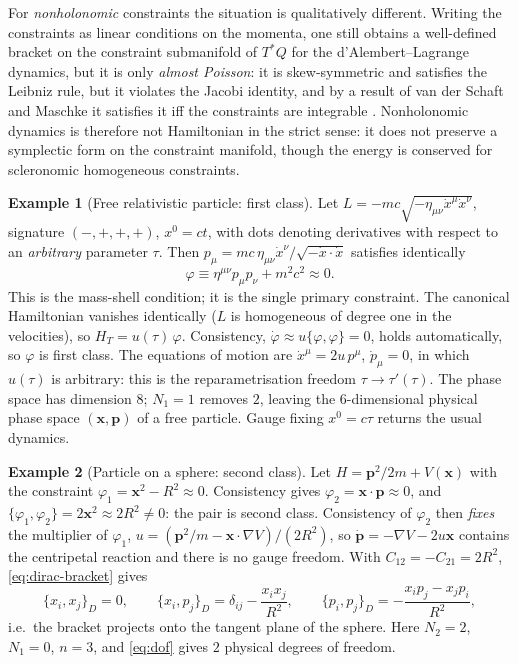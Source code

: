 \documentclass[11pt,a4paper]{article}
\theoremstyle{definition}
\newtheorem{example}{Example}[section]
\theoremstyle{plain}
\theoremstyle{remark}
\newcommand{\Pois}[2]{\{#1,#2\}}
\newcommand{\weq}{\approx}                 %
\begin{document}
For \emph{nonholonomic} constraints the situation is qualitatively different. Writing the
constraints as linear conditions on the momenta, one still obtains a well-defined
bracket on the constraint submanifold of $T^*Q$ for the d'Alembert--Lagrange dynamics, but it is
only \emph{almost Poisson}: it is skew-symmetric and satisfies the Leibniz rule, but it
violates the Jacobi identity, and by a result of van der Schaft and Maschke it satisfies it
iff the constraints are integrable \cite{vdSchaftMaschke1994}. Nonholonomic dynamics is therefore
not Hamiltonian in the strict sense: it does not preserve a symplectic form on the constraint
manifold, though the energy is conserved for scleronomic homogeneous constraints.

\begin{example}[Free relativistic particle: first class]\label{ex:relparticle}
Let $L=-mc\sqrt{-\eta_{\mu\nu}\dot x^\mu\dot x^\nu}$, signature $(-,+,+,+)$, $x^0=ct$, with
dots denoting derivatives with respect to an \emph{arbitrary} parameter $\tau$. Then
$p_\mu=mc\,\eta_{\mu\nu}\dot x^\nu/\sqrt{-\dot x\cdot\dot x}$ satisfies identically
\[
  \varphi\equiv\eta^{\mu\nu}p_\mu p_\nu+m^2c^2\weq0 .
\]
This is the mass-shell condition; it is the single primary constraint. The canonical
Hamiltonian vanishes identically ($L$ is homogeneous of degree one in the velocities), so
$H_T=u(\tau)\,\varphi$. Consistency, $\dot\varphi\weq u\Pois\varphi\varphi=0$, holds
automatically, so $\varphi$ is first class. The equations of motion are
$\dot x^\mu=2u\,p^\mu$, $\dot p_\mu=0$, in which $u(\tau)$ is arbitrary: this is the
reparametrisation freedom $\tau\to\tau'(\tau)$. The phase space has dimension $8$;
$N_1=1$ removes $2$, leaving the $6$-dimensional physical phase space $(\mathbf x,\mathbf p)$ of
a free particle. Gauge fixing $x^0=c\tau$ returns the usual dynamics.
\end{example}

\begin{example}[Particle on a sphere: second class]\label{ex:sphere}
Let $H=\mathbf p^2/2m+V(\mathbf x)$ with the constraint $\varphi_1=\mathbf x^2-R^2\weq0$.
Consistency gives $\varphi_2=\mathbf x\cdot\mathbf p\weq0$, and
$\Pois{\varphi_1}{\varphi_2}=2\mathbf x^2\weq2R^2\ne0$: the pair is second class. Consistency of
$\varphi_2$ then \emph{fixes} the multiplier of $\varphi_1$,
$u=(\mathbf p^2/m-\mathbf x\cdot\nabla V)/(2R^2)$, so $\dot{\mathbf p}=-\nabla V-2u\mathbf x$
contains the centripetal reaction and there is no gauge freedom. With
$C_{12}=-C_{21}=2R^2$, \eqref{eq:dirac-bracket} gives
\[
  \Pois{x_i}{x_j}_D=0,\qquad
  \Pois{x_i}{p_j}_D=\delta_{ij}-\frac{x_ix_j}{R^2},\qquad
  \Pois{p_i}{p_j}_D=-\frac{x_ip_j-x_jp_i}{R^2},
\]
i.e.\ the bracket projects onto the tangent plane of the sphere. Here $N_2=2$, $N_1=0$,
$n=3$, and \eqref{eq:dof} gives $2$ physical degrees of freedom.
\end{example}
\end{document}
